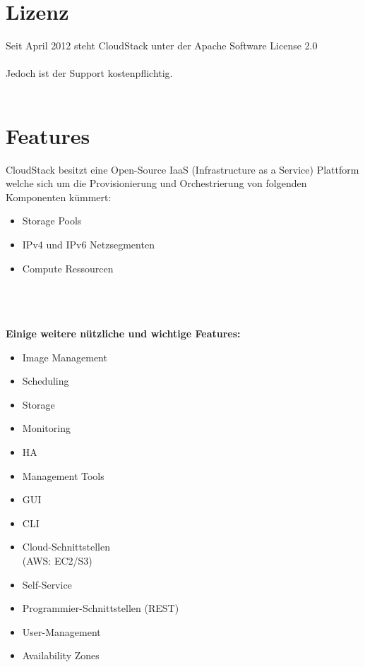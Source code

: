\documentclass[a4paper,nochapterprefix,english,12pt]{scrreprt}
\begin{document}
\section{Lizenz}
Seit April 2012 steht CloudStack unter der Apache Software License 2.0 \cite{apachehistory}\\\\
Jedoch ist der Support kostenpflichtig. \cite{computerwochecloudstack} \\\\
\section{Features}
CloudStack besitzt eine Open-Source IaaS (Infrastructure as a Service) Plattform welche sich um die Provisionierung und Orchestrierung von folgenden Komponenten kümmert:
\begin{itemize}
\item Storage Pools
\item IPv4 und IPv6 Netzsegmenten
\item Compute Ressourcen
\end{itemize}
\cite{OSundAVerg}\\\\\\
\textbf{Einige weitere nützliche und wichtige Features:}
\begin{multicols}{2}
	\begin{itemize}
		\item Image Management
		\item Scheduling
		\item Storage
		\item Monitoring
		\item HA
		\item Management Tools
		\item GUI
		\item CLI
		\item Cloud-Schnittstellen \\(AWS: EC2/S3)
		\item Self-Service
		\item Programmier-Schnittstellen (REST)
		\item User-Management
		\item Availability Zones
	\end{itemize}
\end{multicols}

\newpage
\end{document}
